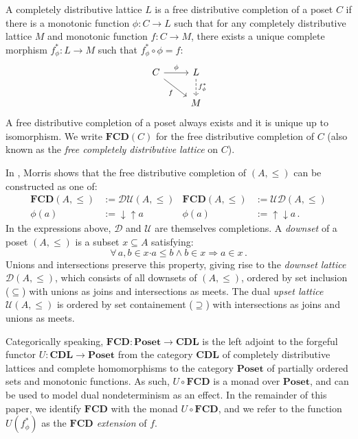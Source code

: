 \documentclass[sigplan,10pt,review,anonymous]{acmart}
\newcommand{\bdot}{\boldsymbol{\cdot}}
\begin{document}
A completely distributive lattice $L$ is a
free distributive completion of
a poset $C$ if there is
a monotonic function $\phi : C \rightarrow L$
such that
for any completely distributive lattice $M$
and monotonic function $f : C \rightarrow M$,
there exists a unique complete morphism $f^*_\phi : L \rightarrow M$
such that $f^*_\phi \circ \phi = f$:
\[
  \begin{tikzcd}
    C \arrow[r, "\phi"] \arrow[rd, "f"'] &
    L \arrow[d, "f^*_\phi", dashed] \\ & M
  \end{tikzcd}
\]
A free distributive completion of a poset
always exists and it is unique up to isomorphism.
We write $\mathbf{FCD}(C)$ for
the free distributive completion of $C$
(also known as the \emph{free completely distributive lattice} on $C$).

In \cite{augtyp}, Morris shows that
the free distributive completion of $(A, \le)$
can be constructed as one of:
\begin{align*}
  \mathbf{FCD}(A, {\le}) &:= \mathcal{D} \mathcal{U}(A, {\le}) &
  \mathbf{FCD}(A, {\le}) &:= \mathcal{U} \mathcal{D}(A, {\le}) \\
  \phi(a) &:= {\downarrow}{\uparrow} a &
  \phi(a) &:= {\uparrow}{\downarrow} a \,.
\end{align*}
In the expressions above,
$\mathcal{D}$ and $\mathcal{U}$
are themselves completions.
A \emph{downset} of a poset $(A, {\le})$
is a subset $x \subseteq A$ satisfying:
\[
  \forall \, a, b \in x \bdot
          a \le b \wedge b \in x \Rightarrow a \in x \,.
\]
Unions and intersections preserve this property,
giving rise to the \emph{downset lattice} $\mathcal{D}(A, {\le})$,
which consists of all downsets of $(A, {\le})$,
ordered by set inclusion (${\subseteq}$) with
unions as joins and intersections as meets.
The dual \emph{upset lattice} $\mathcal{U}(A, {\le})$
is ordered by set containement (${\supseteq}$) with
intersections as joins and unions as meets.

Categorically speaking,
$\mathbf{FCD} : \mathbf{Poset} \rightarrow \mathbf{CDL}$
is the left adjoint to the forgeful functor
$U : \mathbf{CDL} \rightarrow \mathbf{Poset}$
from the category $\mathbf{CDL}$
of completely distributive lattices and complete homomorphisms
to the category $\mathbf{Poset}$
of partially ordered sets and monotonic functions.
As such, $U \! \circ \mathbf{FCD}$ is a monad over $\mathbf{Poset}$,
and can be used to model dual nondeterminism
as an effect.
In the remainder of this paper,
we identify $\mathbf{FCD}$ with
the monad $U \! \circ \mathbf{FCD}$,
and we refer to the function
$U(f_\phi^*)$ as the \emph{$\mathbf{FCD}$ extension} of $f$.
\end{document}
